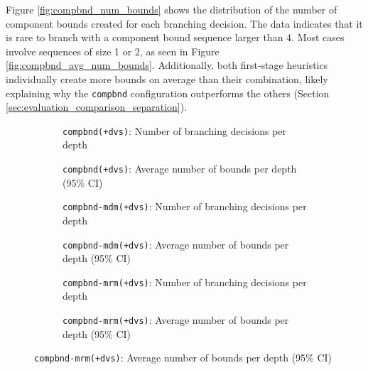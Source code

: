 Figure \ref{fig:compbnd_num_bounds} shows the distribution of the number of component bounds created for each branching decision. The data indicates that it is rare to branch with a component bound sequence larger than 4. Most cases involve sequences of size 1 or 2, as seen in Figure \ref{fig:compbnd_avg_num_bounds}. Additionally, both first-stage heuristics individually create more bounds on average than their combination, likely explaining why the \texttt{compbnd} configuration outperforms the others (Section \ref{sec:evaluation_comparison_separation}).

\begin{figure}
	\centering

	\begin{subfigure}{0.495\textwidth}
		\centering
		
		\caption{\texttt{compbnd(+dvs)}: Number of branching decisions per depth}
		\label{fig:compbnd_depths_distribution}
	\end{subfigure}
	\hfill
	\begin{subfigure}{0.495\textwidth}
		\centering
		
		\caption{\texttt{compbnd(+dvs)}: Average number of bounds per depth (95\% CI)}
		\label{fig:compbnd_avg_num_bounds_vs_depth}
	\end{subfigure}

	\vspace{1em}

	\begin{subfigure}{0.495\textwidth}
		\centering
		
		\caption{\texttt{compbnd-mdm(+dvs)}: Number of branching decisions per depth}
		\label{fig:compbnd-mdm_depths_distribution}
	\end{subfigure}
	\hfill
	\begin{subfigure}{0.495\textwidth}
		\centering
		
		\caption{\texttt{compbnd-mdm(+dvs)}: Average number of bounds per depth (95\% CI)}
		\label{fig:compbnd-mdm_avg_num_bounds_vs_depth}
	\end{subfigure}

	\vspace{1em}

	\begin{subfigure}{0.495\textwidth}
		\centering
		
		\caption{\texttt{compbnd-mrm(+dvs)}: Number of branching decisions per depth}
		\label{fig:compbnd-mrm_depths_distribution}
	\end{subfigure}
	\hfill
	\begin{subfigure}{0.495\textwidth}
		\centering
		
		\caption{\texttt{compbnd-mrm(+dvs)}: Average number of bounds per depth (95\% CI)}
		\label{fig:compbnd-mrm_avg_num_bounds_vs_depth}
	\end{subfigure}


\end{figure}
